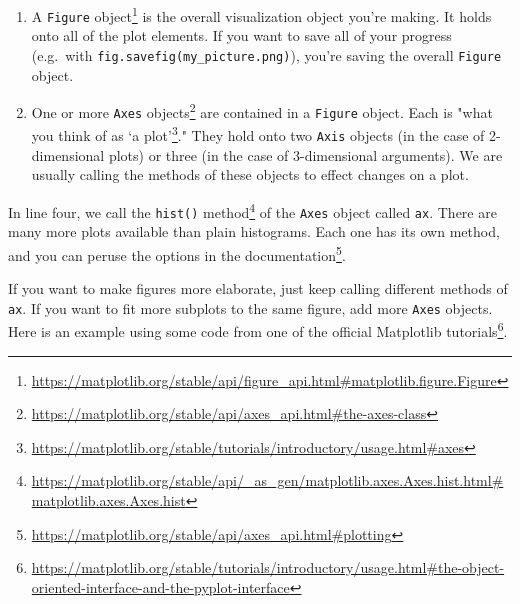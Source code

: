 \documentclass[
  12pt,
]{krantz}
\renewcommand{\href}[2]{#2\footnote{\url{#1}}}
\begin{document}
\begin{enumerate}
\def\labelenumi{\arabic{enumi}.}
\item
  A \href{https://matplotlib.org/stable/api/figure_api.html\#matplotlib.figure.Figure}{\texttt{Figure} object} is the overall visualization object you're making. It holds onto all of the plot elements. If you want to save all of your progress (e.g.~with \texttt{fig.savefig(\textquotesingle{}my\_picture.png\textquotesingle{})}), you're saving the overall \texttt{Figure} object.
\item
  One or more \href{https://matplotlib.org/stable/api/axes_api.html\#the-axes-class}{\texttt{Axes} objects} are contained in a \texttt{Figure} object. Each is \href{https://matplotlib.org/stable/tutorials/introductory/usage.html\#axes}{"what you think of as `a plot'}." They hold onto two \texttt{Axis} objects (in the case of 2-dimensional plots) or three (in the case of 3-dimensional arguments). We are usually calling the methods of these objects to effect changes on a plot.
\end{enumerate}

In line four, we call the \href{https://matplotlib.org/stable/api/_as_gen/matplotlib.axes.Axes.hist.html\#matplotlib.axes.Axes.hist}{\texttt{hist()} method} of the \texttt{Axes} object called \texttt{ax}. There are many more plots available than plain histograms. Each one has its own method, and you can peruse the options in \href{https://matplotlib.org/stable/api/axes_api.html\#plotting}{the documentation}.

If you want to make figures more elaborate, just keep calling different methods of \texttt{ax}. If you want to fit more subplots to the same figure, add more \texttt{Axes} objects. Here is an example using some code from \href{https://matplotlib.org/stable/tutorials/introductory/usage.html\#the-object-oriented-interface-and-the-pyplot-interface}{one of the official Matplotlib tutorials}.
\end{document}
